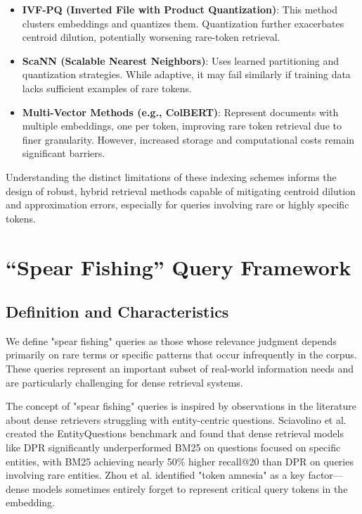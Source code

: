 \documentclass[sigconf,review]{acmart}
\begin{document}
\begin{itemize}
  \item \textbf{IVF-PQ (Inverted File with Product Quantization)}: This method clusters embeddings and quantizes them. Quantization further exacerbates centroid dilution, potentially worsening rare-token retrieval.
  \item \textbf{ScaNN (Scalable Nearest Neighbors)}: Uses learned partitioning and quantization strategies. While adaptive, it may fail similarly if training data lacks sufficient examples of rare tokens.
  \item \textbf{Multi-Vector Methods (e.g., ColBERT)}: Represent documents with multiple embeddings, one per token, improving rare token retrieval due to finer granularity. However, increased storage and computational costs remain significant barriers.
\end{itemize}

Understanding the distinct limitations of these indexing schemes informs the design of robust, hybrid retrieval methods capable of mitigating centroid dilution and approximation errors, especially for queries involving rare or highly specific tokens.

\section{``Spear Fishing'' Query Framework}
\subsection{Definition and Characteristics}
We define "spear fishing" queries as those whose relevance judgment depends primarily on rare terms or specific patterns that occur infrequently in the corpus. These queries represent an important subset of real-world information needs and are particularly challenging for dense retrieval systems.

The concept of "spear fishing" queries is inspired by observations in the literature about dense retrievers struggling with entity-centric questions. Sciavolino et al. \cite{sciavolino2021entityquestions} created the EntityQuestions benchmark and found that dense retrieval models like DPR significantly underperformed BM25 on questions focused on specific entities, with BM25 achieving nearly 50\% higher recall@20 than DPR on queries involving rare entities. Zhou et al. \cite{zhou2023tower} identified "token amnesia" as a key factor—dense models sometimes entirely forget to represent critical query tokens in the embedding.
\end{document}
